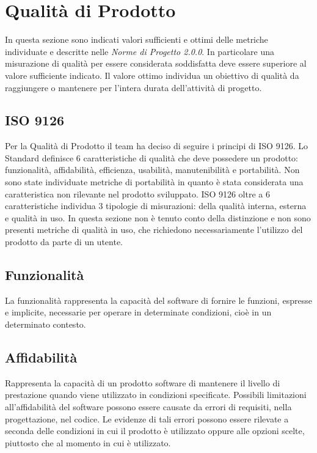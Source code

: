 \section{Qualità di Prodotto}
In questa sezione sono indicati valori sufficienti e ottimi delle metriche individuate e descritte nelle \textit{Norme di Progetto 2.0.0}.
In particolare una misurazione di qualità per essere considerata soddisfatta deve essere superiore al valore sufficiente indicato. 
Il valore ottimo individua un obiettivo di qualità da raggiungere o mantenere per l'intera durata dell'attività di progetto.
\subsection{ISO 9126}
Per la Qualità di Prodotto il team ha deciso di seguire i principi di ISO 9126.
Lo Standard definisce 6 caratteristiche di qualità che deve possedere un prodotto: funzionalità, affidabilità, efficienza, usabilità, manutenibilità e portabilità. 
Non sono state individuate metriche di portabilità in quanto è stata considerata una caratteristica non rilevante nel prodotto sviluppato. 
ISO 9126 oltre a 6 caratteristiche individua 3 tipologie di misurazioni: della qualità interna, esterna e qualità in uso. 
In questa sezione non è tenuto conto della distinzione e non sono presenti metriche di qualità in uso, che richiedono necessariamente l'utilizzo del prodotto da parte di un utente.

\subsection{Funzionalità}
La funzionalità rappresenta la capacità del software di fornire le funzioni, espresse e implicite, necessarie per operare in determinate condizioni, cioè in un determinato contesto.
\def\productquality{
    {
        Correttezza dello scambio dei dati,
        $D_{err} = \#\ di\ errori$, 
        -,
        $D_{err} = 0$,
        un valore sufficiente sarà deciso in fasi successive del progetto
    },
}


\subsection{Affidabilità}
Rappresenta la capacità di un prodotto software di mantenere il livello di prestazione quando viene utilizzato in condizioni specificate. Possibili limitazioni all'affidabilità del software possono essere causate da errori di requisiti, nella progettazione, nel codice. Le evidenze di tali errori possono essere rilevate a seconda delle condizioni in cui il prodotto è utilizzato oppure alle opzioni scelte, piuttosto che al momento in cui è utilizzato.
\def\productquality{
    {
        Densità di errori,
        $E_{density} = A_{err}/B_{tests}$, 
        -,
        -,
        è stato ritenuto prematuro definire valori sufficienti e ottimi per la metrica
    },
}


